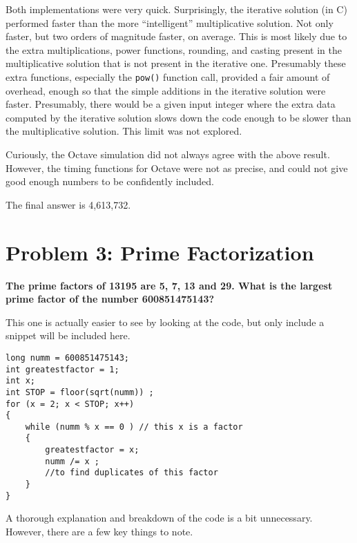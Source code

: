 \documentclass{article}
\begin{document}
Both implementations were very quick. Surprisingly, the iterative solution (in C) performed 
faster than the more ``intelligent'' multiplicative solution. Not only faster, but two orders 
of magnitude faster, on average. This is most likely due to the extra multiplications, power 
functions, rounding, and casting present in the multiplicative solution that is not present 
in the iterative one. Presumably these extra functions, especially the \texttt{pow()} 
function call, provided a fair amount of overhead, enough so that the simple additions
in the iterative solution were faster. Presumably, there would be a given input integer where 
the extra data computed by the iterative solution slows down the code enough to be slower 
than the multiplicative solution. This limit was not explored.

Curiously, the Octave simulation did not always agree with the above result. However, the 
timing functions for Octave were not as precise, and could not give good enough numbers to be 
confidently included.

The final answer is 4,613,732.

\section{Problem 3: Prime Factorization}

\textbf{The prime factors of 13195 are 5, 7, 13 and 29. What is the largest prime factor
of the number 600851475143?}

\bigskip

This one is actually easier to see by looking at the code, but only include a snippet will be 
included here.

\begin{lstlisting}
long numm = 600851475143;
int greatestfactor = 1;
int x;
int STOP = floor(sqrt(numm)) ;
for (x = 2; x < STOP; x++)
{
	while (numm % x == 0 ) // this x is a factor
	{
		greatestfactor = x;
		numm /= x ;
		//to find duplicates of this factor
	}
}
\end{lstlisting}

A thorough explanation and breakdown of the code is a bit unnecessary. However, there are a 
few key things to note.
\end{document}
